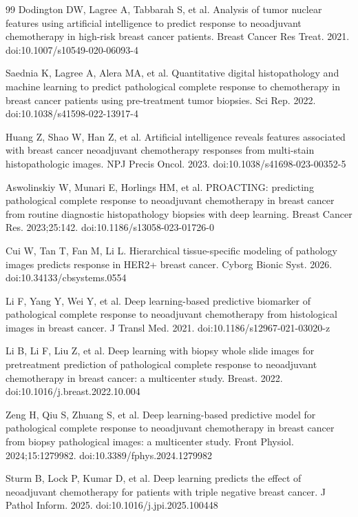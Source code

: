 \documentclass[10pt,a4paper,twocolumn]{article}
\begin{document}
\begin{thebibliography}{99}
 Dodington DW, Lagree A, Tabbarah S, et al. Analysis of tumor nuclear features using artificial intelligence to predict response to neoadjuvant chemotherapy in high-risk breast cancer patients. Breast Cancer Res Treat. 2021. doi:10.1007/s10549-020-06093-4

 Saednia K, Lagree A, Alera MA, et al. Quantitative digital histopathology and machine learning to predict pathological complete response to chemotherapy in breast cancer patients using pre-treatment tumor biopsies. Sci Rep. 2022. doi:10.1038/s41598-022-13917-4

 Huang Z, Shao W, Han Z, et al. Artificial intelligence reveals features associated with breast cancer neoadjuvant chemotherapy responses from multi-stain histopathologic images. NPJ Precis Oncol. 2023. doi:10.1038/s41698-023-00352-5

 Aswolinskiy W, Munari E, Horlings HM, et al. PROACTING: predicting pathological complete response to neoadjuvant chemotherapy in breast cancer from routine diagnostic histopathology biopsies with deep learning. Breast Cancer Res. 2023;25:142. doi:10.1186/s13058-023-01726-0

 Cui W, Tan T, Fan M, Li L. Hierarchical tissue-specific modeling of pathology images predicts response in HER2+ breast cancer. Cyborg Bionic Syst. 2026. doi:10.34133/cbsystems.0554

 Li F, Yang Y, Wei Y, et al. Deep learning-based predictive biomarker of pathological complete response to neoadjuvant chemotherapy from histological images in breast cancer. J Transl Med. 2021. doi:10.1186/s12967-021-03020-z

 Li B, Li F, Liu Z, et al. Deep learning with biopsy whole slide images for pretreatment prediction of pathological complete response to neoadjuvant chemotherapy in breast cancer: a multicenter study. Breast. 2022. doi:10.1016/j.breast.2022.10.004

 Zeng H, Qiu S, Zhuang S, et al. Deep learning-based predictive model for pathological complete response to neoadjuvant chemotherapy in breast cancer from biopsy pathological images: a multicenter study. Front Physiol. 2024;15:1279982. doi:10.3389/fphys.2024.1279982

 Sturm B, Lock P, Kumar D, et al. Deep learning predicts the effect of neoadjuvant chemotherapy for patients with triple negative breast cancer. J Pathol Inform. 2025. doi:10.1016/j.jpi.2025.100448


\end{thebibliography}
\end{document}

